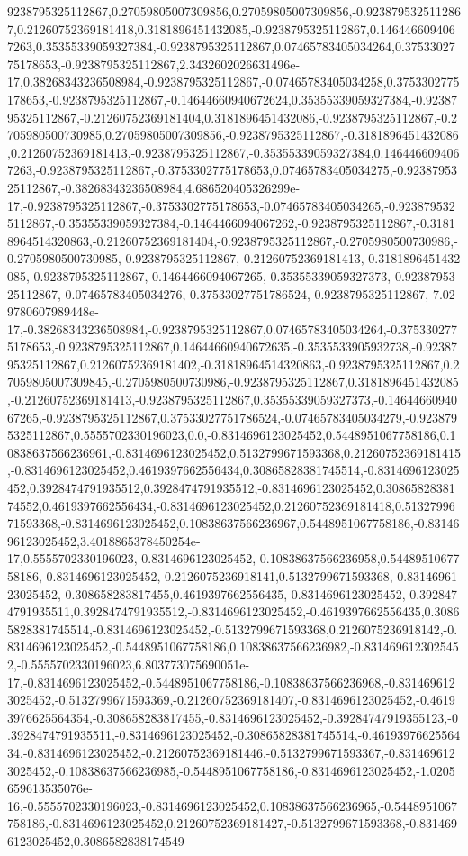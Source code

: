 9238795325112867,0.27059805007309856,0.27059805007309856,-0.9238795325112867,0.21260752369181418,0.3181896451432085,-0.9238795325112867,0.1464466094067263,0.35355339059327384,-0.9238795325112867,0.07465783405034264,0.3753302775178653,-0.9238795325112867,2.3432602026631496e-17,0.38268343236508984,-0.9238795325112867,-0.07465783405034258,0.3753302775178653,-0.9238795325112867,-0.14644660940672624,0.35355339059327384,-0.9238795325112867,-0.21260752369181404,0.3181896451432086,-0.9238795325112867,-0.2705980500730985,0.27059805007309856,-0.9238795325112867,-0.3181896451432086,0.21260752369181413,-0.9238795325112867,-0.35355339059327384,0.1464466094067263,-0.9238795325112867,-0.3753302775178653,0.07465783405034275,-0.9238795325112867,-0.38268343236508984,4.686520405326299e-17,-0.9238795325112867,-0.3753302775178653,-0.07465783405034265,-0.9238795325112867,-0.35355339059327384,-0.1464466094067262,-0.9238795325112867,-0.31818964514320863,-0.21260752369181404,-0.9238795325112867,-0.2705980500730986,-0.2705980500730985,-0.9238795325112867,-0.21260752369181413,-0.3181896451432085,-0.9238795325112867,-0.1464466094067265,-0.35355339059327373,-0.9238795325112867,-0.07465783405034276,-0.37533027751786524,-0.9238795325112867,-7.029780607989448e-17,-0.38268343236508984,-0.9238795325112867,0.07465783405034264,-0.3753302775178653,-0.9238795325112867,0.14644660940672635,-0.3535533905932738,-0.9238795325112867,0.21260752369181402,-0.31818964514320863,-0.9238795325112867,0.27059805007309845,-0.2705980500730986,-0.9238795325112867,0.3181896451432085,-0.21260752369181413,-0.9238795325112867,0.35355339059327373,-0.1464466094067265,-0.9238795325112867,0.37533027751786524,-0.07465783405034279,-0.9238795325112867,0.5555702330196023,0.0,-0.8314696123025452,0.5448951067758186,0.10838637566236961,-0.8314696123025452,0.5132799671593368,0.21260752369181415,-0.8314696123025452,0.4619397662556434,0.30865828381745514,-0.8314696123025452,0.3928474791935512,0.3928474791935512,-0.8314696123025452,0.3086582838174552,0.4619397662556434,-0.8314696123025452,0.21260752369181418,0.5132799671593368,-0.8314696123025452,0.10838637566236967,0.5448951067758186,-0.8314696123025452,3.4018865378450254e-17,0.5555702330196023,-0.8314696123025452,-0.10838637566236958,0.5448951067758186,-0.8314696123025452,-0.2126075236918141,0.5132799671593368,-0.8314696123025452,-0.308658283817455,0.4619397662556435,-0.8314696123025452,-0.3928474791935511,0.3928474791935512,-0.8314696123025452,-0.4619397662556435,0.30865828381745514,-0.8314696123025452,-0.5132799671593368,0.2126075236918142,-0.8314696123025452,-0.5448951067758186,0.10838637566236982,-0.8314696123025452,-0.5555702330196023,6.803773075690051e-17,-0.8314696123025452,-0.5448951067758186,-0.10838637566236968,-0.8314696123025452,-0.5132799671593369,-0.21260752369181407,-0.8314696123025452,-0.46193976625564354,-0.308658283817455,-0.8314696123025452,-0.39284747919355123,-0.3928474791935511,-0.8314696123025452,-0.30865828381745514,-0.4619397662556434,-0.8314696123025452,-0.21260752369181446,-0.5132799671593367,-0.8314696123025452,-0.10838637566236985,-0.5448951067758186,-0.8314696123025452,-1.0205659613535076e-16,-0.5555702330196023,-0.8314696123025452,0.10838637566236965,-0.5448951067758186,-0.8314696123025452,0.21260752369181427,-0.5132799671593368,-0.8314696123025452,0.3086582838174549